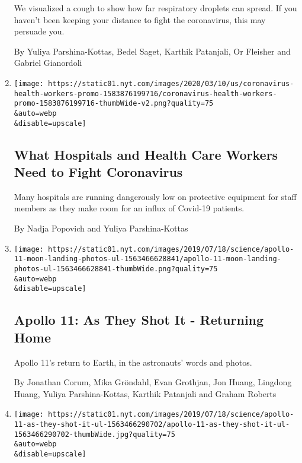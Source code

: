 \begin{enumerate}
  We visualized a cough to show how far respiratory droplets can spread.
  If you haven't been keeping your distance to fight the coronavirus,
  this may persuade you.

  By Yuliya Parshina-Kottas, Bedel Saget, Karthik Patanjali, Or Fleisher
  and Gabriel Gianordoli
\item
  \href{/interactive/2020/03/11/us/virus-health-workers.html}{}

  \texttt{[image: https://static01.nyt.com/images/2020/03/10/us/coronavirus-health-workers-promo-1583876199716/coronavirus-health-workers-promo-1583876199716-thumbWide-v2.png?quality=75\\\&auto=webp\\\&disable=upscale]}

  \hypertarget{what-hospitals-and-health-care-workers-need-to-fight-coronavirus}{%
  \subsection{What Hospitals and Health Care Workers Need to Fight
  Coronavirus}\label{what-hospitals-and-health-care-workers-need-to-fight-coronavirus}}

  Many hospitals are running dangerously low on protective equipment for
  staff members as they make room for an influx of Covid-19 patients.

  By Nadja Popovich and Yuliya Parshina-Kottas
\item
  \href{/interactive/2019/07/18/science/apollo-11-moon-earth-photos-ul.html}{}

  \texttt{[image: https://static01.nyt.com/images/2019/07/18/science/apollo-11-moon-landing-photos-ul-1563466628841/apollo-11-moon-landing-photos-ul-1563466628841-thumbWide.png?quality=75\\\&auto=webp\\\&disable=upscale]}

  \hypertarget{apollo-11-as-they-shot-it---returning-home}{%
  \subsection{Apollo 11: As They Shot It - Returning
  Home}\label{apollo-11-as-they-shot-it---returning-home}}

  Apollo 11's return to Earth, in the astronauts' words and photos.

  By Jonathan Corum, Mika Gröndahl, Evan Grothjan, Jon Huang, Lingdong
  Huang, Yuliya Parshina-Kottas, Karthik Patanjali and Graham Roberts
\item
  \href{/interactive/2019/07/18/science/apollo-11-as-they-shot-it-ul.html}{}

  \texttt{[image: https://static01.nyt.com/images/2019/07/18/science/apollo-11-as-they-shot-it-ul-1563466290702/apollo-11-as-they-shot-it-ul-1563466290702-thumbWide.jpg?quality=75\\\&auto=webp\\\&disable=upscale]}


\end{enumerate}

